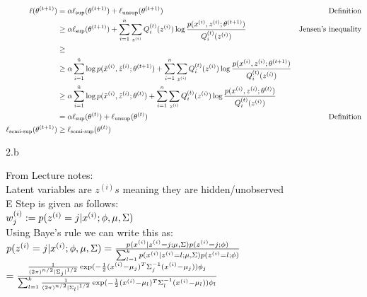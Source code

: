   \begin{answer}
    \begin{align*}
      \ell(\theta^{(t+1)})
      &= \alpha \ell_\text{sup}(\theta^{(t+1)}) + \ell_\text{unsup}(\theta^{(t+1)})
          &\text{Definition} \\
      &\ge \alpha \ell_\text{sup}(\theta^{(t+1)}) + \sum_{i=1}^{n}\sum_{z^{(i)}}Q_i^{(t)}(z^{(i)})\log\frac{p(x^{(i)},z^{(i)};\theta^{(t+1)})}{Q_i^{(t)}(z^{(i)})}
          &\text{Jensen's inequality} \\
      &\ge \\
     &\ge \alpha \sum_{i=1}^{\tilde{n}} \log p(\tilde{x}^{(i)},\tilde{z}^{(i)};\theta^{(t+1)})  + \sum_{i=1}^{n}\sum_{z^{(i)}}Q_i^{(t)}(z^{(i)})\log\frac{p(x^{(i)},z^{(i)};\theta^{(t+1)})}{Q_i^{(t)}(z^{(i)})} \\
          &\ge \alpha \sum_{i=1}^{\tilde{n}} \log p(\tilde{x}^{(i)},\tilde{z}^{(i)};\theta^{(t)})  + \sum_{i=1}^{n}\sum_{z^{(i)}}Q_i^{(t)}(z^{(i)})\log\frac{p(x^{(i)},z^{(i)};\theta^{(t)})}{Q_i^{(t)}(z^{(i)})} \\ 
           & = \alpha \ell_\text{sup}(\theta^{(t)}) + \ell_\text{unsup}(\theta^{(t)}) &\text{Definition} \\
             \ell_\text{semi-sup}(\theta^{(t+1)}) &\ge \ell_\text{semi-sup}(\theta^{(t)}) \\
    \end{align*}
  \end{answer}
\clearpage

\LARGE
2.b
\normalsize

  \begin{answer}
From Lecture notes: \\
Latent variables are  $z^{(i)} s $ meaning they are hidden/unobserved \\
E Step is given as follows: \\
$ w^{(i)}_j :=p(z^{(i)} = j \vert x^{(i)} ; \phi, \mu, \Sigma) $ \\

Using Baye's rule we can write this as: \\
$ p(z^{(i)} = j \vert x^{(i)} ; \phi, \mu, \Sigma) \\ = 
\frac{p(x^{(i)} \vert z^{(i)} = j ; \mu, \Sigma) p(z^{(i)} = j; \phi)}
{\sum_{l=1}^k p(x^{(i)} \vert z^{(i)} = l ; \mu, \Sigma) p(z^{(i)}=l; \phi)} $ \\

$ =
\frac
{\frac{1}{(2\pi)^{n/2}\vert\Sigma_j\vert^{1/2}} \exp(-\frac{1}{2}(x^{(i)} - \mu_j)^T \Sigma_j^{-1}(x^{(i)} - \mu_j))\phi_j}
{\sum_{l=1}^k \frac{1}{(2\pi)^{n/2}\vert\Sigma_l\vert^{1/2}} \exp(-\frac{1}{2}(x^{(i)} - \mu_l)^T \Sigma_l^{-1}(x^{(i)} - \mu_l))\phi_l} $ \\

  \end{answer}
\clearpage

